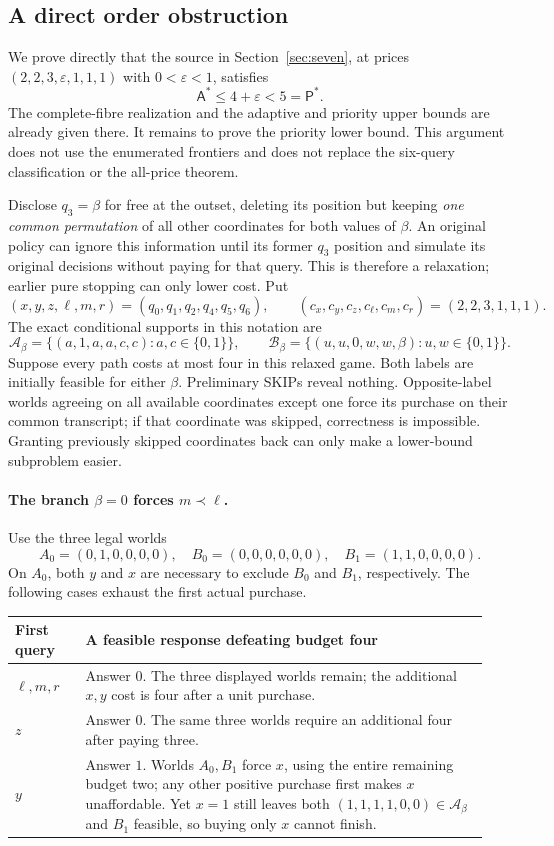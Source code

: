 \documentclass[pdflatex,sn-mathphys-num]{sn-jnl}
\newcommand{\A}{\mathsf{A}}
\newcommand{\Pcost}{\mathsf{P}}
\theoremstyle{thmstyleone}
\theoremstyle{thmstylethree}
\theoremstyle{thmstyletwo}
\begin{document}
\subsection{A direct order obstruction}
\label{app:order-obstruction}

We prove directly that the source in Section~\ref{sec:seven}, at prices
$(2,2,3,\varepsilon,1,1,1)$ with $0<\varepsilon<1$, satisfies
\[
 \A^*\le 4+\varepsilon<5=\Pcost^*.
\]
The complete-fibre realization and the adaptive and priority upper bounds
are already given there. It remains to prove the priority lower bound.
This argument does not use the enumerated frontiers and does not replace
the six-query classification or the all-price theorem.

Disclose $q_3=\beta$ for free at the outset, deleting its position but
keeping \emph{one common permutation} of all other coordinates for both
values of $\beta$. An original policy can ignore this information until
its former $q_3$ position and simulate its original decisions without
paying for that query. This is therefore a relaxation; earlier pure
stopping can only lower cost. Put
\[
 (x,y,z,\ell,m,r)=(q_0,q_1,q_2,q_4,q_5,q_6),
 \qquad (c_x,c_y,c_z,c_\ell,c_m,c_r)=(2,2,3,1,1,1).
\]
The exact conditional supports in this notation are
\[
 \mathcal A_\beta=\{(a,1,a,a,c,c):a,c\in\{0,1\}\},\qquad
 \mathcal B_\beta=\{(u,u,0,w,w,\beta):u,w\in\{0,1\}\}.
\]
Suppose every path costs at most four in this relaxed game. Both labels
are initially feasible for either $\beta$. Preliminary SKIPs reveal
nothing. Opposite-label worlds agreeing on all available coordinates
except one force its purchase on their common transcript; if that
coordinate was skipped, correctness is impossible. Granting previously
skipped coordinates back can only make a lower-bound subproblem easier.

\paragraph*{The branch $\beta=0$ forces $m\prec\ell$.}
Use the three legal worlds
\[
 A_0=(0,1,0,0,0,0),\quad B_0=(0,0,0,0,0,0),\quad
 B_1=(1,1,0,0,0,0).
\]
On $A_0$, both $y$ and $x$ are necessary to exclude $B_0$ and $B_1$,
respectively. The following cases exhaust the first actual purchase.

\begin{center}\small
\begin{tabular}{@{}p{0.14\linewidth}p{0.80\linewidth}@{}}
\toprule
First query & A feasible response defeating budget four\\\midrule
$\ell,m,r$ & Answer $0$. The three displayed worlds remain; the
additional $x,y$ cost is four after a unit purchase.\\
$z$ & Answer $0$. The same three worlds require an additional four after
paying three.\\
$y$ & Answer $1$. Worlds $A_0,B_1$ force $x$, using the entire remaining
budget two; any other positive purchase first makes $x$ unaffordable.
Yet $x=1$ still leaves both $(1,1,1,1,0,0)\in\mathcal A_\beta$ and
$B_1$ feasible, so buying only $x$ cannot finish.\\
\bottomrule
\end{tabular}
\end{center}
\end{document}
